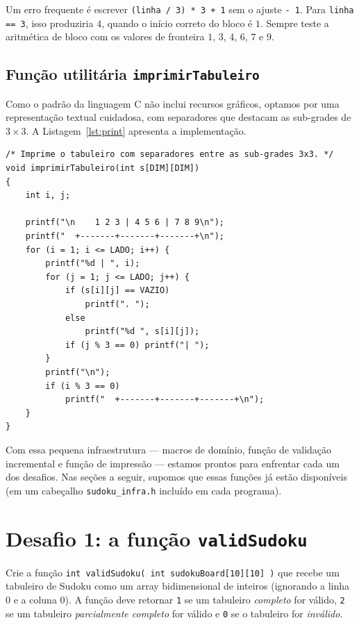 \documentclass[11pt,a4paper,oneside]{report}
\newcommand{\codigo}[1]{\texttt{\color{deitelblue}#1}}
\begin{document}
\begin{erro}
Um erro frequente é escrever \codigo{(linha / 3) * 3 + 1} sem o ajuste
\codigo{- 1}. Para \codigo{linha == 3}, isso produziria $4$, quando o início
correto do bloco é $1$. Sempre teste a aritmética de bloco com os valores
de fronteira $1$, $3$, $4$, $6$, $7$ e $9$.
\end{erro}

\subsection{Função utilitária \texttt{imprimirTabuleiro}}

Como o padrão da linguagem C não inclui recursos gráficos, optamos por uma
representação textual cuidadosa, com separadores que destacam as sub-grades
de $3 \times 3$. A Listagem~\ref{lst:print} apresenta a implementação.

\begin{lstlisting}[caption={Impressão formatada do tabuleiro.},label={lst:print}]
/* Imprime o tabuleiro com separadores entre as sub-grades 3x3. */
void imprimirTabuleiro(int s[DIM][DIM])
{
    int i, j;

    printf("\n    1 2 3 | 4 5 6 | 7 8 9\n");
    printf("  +-------+-------+-------+\n");
    for (i = 1; i <= LADO; i++) {
        printf("%d | ", i);
        for (j = 1; j <= LADO; j++) {
            if (s[i][j] == VAZIO)
                printf(". ");
            else
                printf("%d ", s[i][j]);
            if (j % 3 == 0) printf("| ");
        }
        printf("\n");
        if (i % 3 == 0)
            printf("  +-------+-------+-------+\n");
    }
}
\end{lstlisting}

Com essa pequena infraestrutura --- macros de domínio, função de validação
incremental e função de impressão --- estamos prontos para enfrentar cada
um dos desafios. Nas seções a seguir, supomos que essas funções já estão
disponíveis (em um cabeçalho \codigo{sudoku\_infra.h} incluído em cada
programa).

\section{Desafio 1: a função \texttt{validSudoku}}

\begin{enunciado}
Crie a função \texttt{int validSudoku( int sudokuBoard[10][10] )} que recebe
um tabuleiro de Sudoku como um array bidimensional de inteiros (ignorando a
linha 0 e a coluna 0). A função deve retornar \texttt{1} se um tabuleiro
\emph{completo} for válido, \texttt{2} se um tabuleiro \emph{parcialmente
completo} for válido e \texttt{0} se o tabuleiro for \emph{inválido}.
\end{enunciado}
\end{document}
